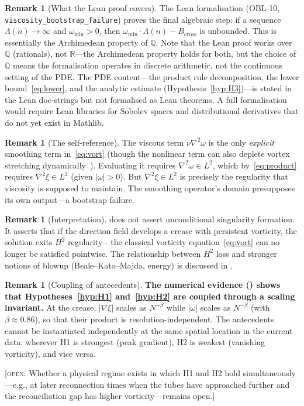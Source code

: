 \documentclass[11pt,a4paper]{article}
\theoremstyle{definition}
\newtheorem{remark}[theorem]{Remark}
\newcommand{\R}{\mathbb{R}}
\newcommand{\Q}{\mathbb{Q}}
\newcommand{\grad}{\nabla}
\newcommand{\lapl}{\nabla^2}
\newcommand{\abs}[1]{\lvert #1 \rvert}
\newcommand{\strongclaim}[1]{\textbf{#1}}  %
\newcommand{\openquestion}[1]{%
  \textcolor{black!70}{[\textsc{open}: #1]}}
\begin{document}
\begin{remark}[What the Lean proof covers]\label{rmk:lean-scope}
The Lean formalisation (OBL-10, \texttt{viscosity\_bootstrap\_failure})
proves the final algebraic step: if a sequence $\Lambda(n)\to\infty$
and $\omega_{\min}>0$, then $\omega_{\min}\cdot\Lambda(n)-B_{\mathrm{cross}}$
is unbounded.  This is essentially the Archimedean property of
$\Q$.  Note that the Lean proof works over $\Q$ (rationals), not
$\R$---the Archimedean property holds for both, but the choice of
$\Q$ means the formalisation operates in discrete arithmetic, not
the continuous setting of the PDE\@.  The PDE content---the product
rule decomposition, the lower
bound~\eqref{eq:lower}, and the analytic
estimate (Hypothesis~\ref{hyp:H3})---is stated in the Lean doc-strings
but not formalised as Lean theorems.  A full formalisation would
require Lean libraries for Sobolev spaces and distributional
derivatives that do not yet exist in Mathlib.
\end{remark}

\begin{remark}[The self-reference]
The viscous term $\nu\lapl\omega$ is the only \emph{explicit}
smoothing term in~\eqref{eq:vort} (though the nonlinear term can
also deplete vortex stretching dynamically~\cite{HouLi2006}).
Evaluating it requires
$\lapl\omega\in L^2$, which by~\eqref{eq:product} requires
$\lapl\xi\in L^2$ (given $\abs{\omega}>0$).  But $\lapl\xi\in L^2$
is precisely the regularity that viscosity is supposed to maintain.
The smoothing operator's domain presupposes its own output---a
bootstrap failure.
\end{remark}

\begin{remark}[Interpretation]
 does not assert unconditional singularity formation.
It asserts that if the direction field develops a crease with
persistent vorticity, the solution exits $H^2$ regularity---the
classical vorticity equation~\eqref{eq:vort} can no longer be
satisfied pointwise.  The relationship between $H^2$ loss and
stronger notions of blowup (Beale--Kato--Majda, energy) is
discussed in .
\end{remark}

\begin{remark}[Coupling of antecedents]\label{rmk:coupling}
\strongclaim{The numerical evidence () shows that
Hypotheses~\ref{hyp:H1} and~\ref{hyp:H2} are coupled through a
scaling invariant.}  At the crease, $\abs{\grad\xi}$ scales as
$N^{+\beta}$ while $\abs{\omega}$ scales as $N^{-\beta}$ (with
$\beta\approx 0.86$), so that their product is
resolution-independent.  The antecedents cannot be instantiated
independently at the same spatial location in the current data:
wherever H1 is strongest (peak gradient), H2 is weakest (vanishing
vorticity), and vice versa.

\openquestion{Whether a physical regime exists in which H1 and H2
hold simultaneously---e.g., at later reconnection times when the
tubes have approached further and the reconciliation gap
has higher vorticity---remains open.}
\end{remark}
\end{document}
